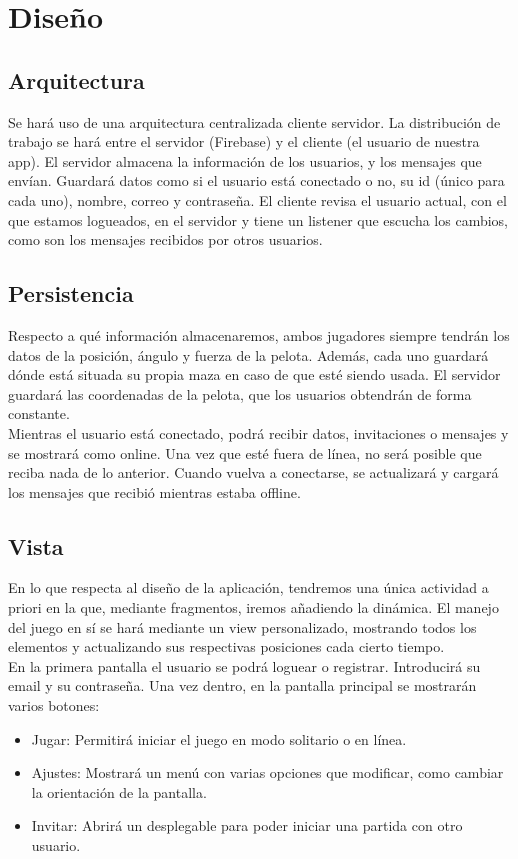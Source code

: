 \documentclass[a4paper,openright,12pt]{article}
\begin{document}
\section{Diseño}
\subsection{Arquitectura}
Se hará uso de una arquitectura centralizada cliente servidor. La distribución de trabajo se hará entre el servidor (Firebase) y el cliente (el usuario de nuestra app). El servidor almacena la información de los usuarios, y los mensajes que envían. Guardará datos como si el usuario está conectado o no, su id (único para cada uno), nombre, correo y contraseña. El cliente revisa el usuario actual, con el que estamos logueados, en el servidor y tiene un listener que escucha los cambios, como son los mensajes recibidos por otros usuarios.


\subsection{Persistencia}
Respecto a qué información almacenaremos, ambos jugadores siempre tendrán los datos de la posición, ángulo y fuerza de la pelota. Además, cada uno guardará dónde está situada su propia maza en caso de que esté siendo usada. El servidor guardará las coordenadas de la pelota, que los usuarios obtendrán de forma constante. \\
Mientras el usuario está conectado, podrá recibir datos, invitaciones o mensajes y se mostrará como online. Una vez que esté fuera de línea, no será posible que reciba nada de lo anterior. Cuando vuelva a conectarse, se actualizará y cargará los mensajes que recibió mientras estaba offline.

\subsection{Vista}
En lo que respecta al diseño de la aplicación, tendremos una única actividad a priori en la que, mediante fragmentos, iremos añadiendo la dinámica. El manejo del juego en sí se hará mediante un view personalizado, mostrando todos los elementos y actualizando sus respectivas posiciones cada cierto tiempo. \\
En la primera pantalla el usuario se podrá loguear o registrar. Introducirá su email y su contraseña. Una vez dentro, en la pantalla principal se mostrarán varios botones: 
\begin{itemize}
    \item Jugar: Permitirá iniciar el juego en modo solitario o en línea.
    \item Ajustes: Mostrará un menú con varias opciones que modificar, como cambiar la orientación de la pantalla.
    \item Invitar: Abrirá un desplegable para poder iniciar una partida con otro usuario.
\end{itemize}
\end{document}
